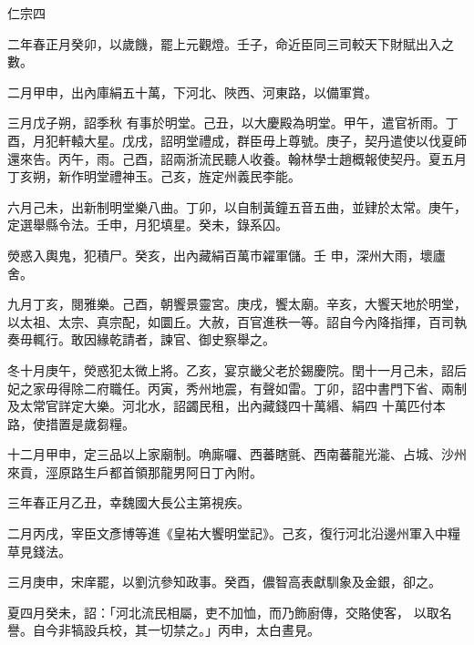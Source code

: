 
\begin{pinyinscope}

 仁宗四



 二年春正月癸卯，以歲饑，罷上元觀燈。壬子，命近臣同三司較天下財賦出入之數。



 二月甲申，出內庫絹五十萬，下河北、陜西、河東路，以備軍賞。



 三月戊子朔，詔季秋
 有事於明堂。己丑，以大慶殿為明堂。甲午，遣官祈雨。丁酉，月犯軒轅大星。戊戌，詔明堂禮成，群臣毋上尊號。庚子，契丹遣使以伐夏師還來告。丙午，雨。己酉，詔兩浙流民聽人收養。翰林學士趙概報使契丹。夏五月丁亥朔，新作明堂禮神玉。己亥，旌定州義民李能。



 六月己未，出新制明堂樂八曲。丁卯，以自制黃鐘五音五曲，並肄於太常。庚午，定選舉縣令法。壬申，月犯填星。癸未，錄系囚。



 熒惑入輿鬼，犯積尸。癸亥，出內藏絹百萬市糴軍儲。壬
 申，深州大雨，壞廬舍。



 九月丁亥，閱雅樂。己酉，朝饗景靈宮。庚戌，饗太廟。辛亥，大饗天地於明堂，以太祖、太宗、真宗配，如圜丘。大赦，百官進秩一等。詔自今內降指揮，百司執奏毋輒行。敢因緣乾請者，諫官、御史察舉之。



 冬十月庚午，熒惑犯太微上將。乙亥，宴京畿父老於錫慶院。閏十一月己未，詔后妃之家毋得除二府職任。丙寅，秀州地震，有聲如雷。丁卯，詔中書門下省、兩制及太常官詳定大樂。河北水，詔蠲民租，出內藏錢四十萬緡、絹四
 十萬匹付本路，使措置是歲芻糧。



 十二月甲申，定三品以上家廟制。唃廝囉、西蕃瞎氈、西南蕃龍光㴰、占城、沙州來貢，涇原路生戶都首領那龍男阿日丁內附。



 三年春正月乙丑，幸魏國大長公主第視疾。



 二月丙戌，宰臣文彥博等進《皇祐大饗明堂記》。己亥，復行河北沿邊州軍入中糧草見錢法。



 三月庚申，宋庠罷，以劉沆參知政事。癸酉，儂智高表獻馴象及金銀，卻之。



 夏四月癸未，詔：「河北流民相屬，吏不加恤，而乃飾廚傳，交賂使客，
 以取名譽。自今非犒設兵校，其一切禁之。」丙申，太白晝見。




\end{pinyinscope}
